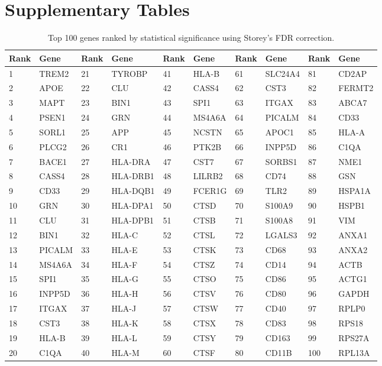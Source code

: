 \documentclass[12pt]{article}
\begin{document}
\section*{Supplementary Tables}

\begin{table}[H]
\centering
\scriptsize
\begin{tabular}{ll|ll|ll|ll|ll}
\toprule
\textbf{Rank} & \textbf{Gene} & \textbf{Rank} & \textbf{Gene} & \textbf{Rank} & \textbf{Gene} & \textbf{Rank} & \textbf{Gene} & \textbf{Rank} & \textbf{Gene} \\
\midrule
1 & TREM2 & 21 & TYROBP & 41 & HLA-B & 61 & SLC24A4 & 81 & CD2AP \\
2 & APOE & 22 & CLU & 42 & CASS4 & 62 & CST3 & 82 & FERMT2 \\
3 & MAPT & 23 & BIN1 & 43 & SPI1 & 63 & ITGAX & 83 & ABCA7 \\
4 & PSEN1 & 24 & GRN & 44 & MS4A6A & 64 & PICALM & 84 & CD33 \\
5 & SORL1 & 25 & APP & 45 & NCSTN & 65 & APOC1 & 85 & HLA-A \\
6 & PLCG2 & 26 & CR1 & 46 & PTK2B & 66 & INPP5D & 86 & C1QA \\
7 & BACE1 & 27 & HLA-DRA & 47 & CST7 & 67 & SORBS1 & 87 & NME1 \\
8 & CASS4 & 28 & HLA-DRB1 & 48 & LILRB2 & 68 & CD74 & 88 & GSN \\
9 & CD33 & 29 & HLA-DQB1 & 49 & FCER1G & 69 & TLR2 & 89 & HSPA1A \\
10 & GRN & 30 & HLA-DPA1 & 50 & CTSD & 70 & S100A9 & 90 & HSPB1 \\
11 & CLU & 31 & HLA-DPB1 & 51 & CTSB & 71 & S100A8 & 91 & VIM \\
12 & BIN1 & 32 & HLA-C & 52 & CTSL & 72 & LGALS3 & 92 & ANXA1 \\
13 & PICALM & 33 & HLA-E & 53 & CTSK & 73 & CD68 & 93 & ANXA2 \\
14 & MS4A6A & 34 & HLA-F & 54 & CTSZ & 74 & CD14 & 94 & ACTB \\
15 & SPI1 & 35 & HLA-G & 55 & CTSO & 75 & CD86 & 95 & ACTG1 \\
16 & INPP5D & 36 & HLA-H & 56 & CTSV & 76 & CD80 & 96 & GAPDH \\
17 & ITGAX & 37 & HLA-J & 57 & CTSW & 77 & CD40 & 97 & RPLP0 \\
18 & CST3 & 38 & HLA-K & 58 & CTSX & 78 & CD83 & 98 & RPS18 \\
19 & HLA-B & 39 & HLA-L & 59 & CTSY & 79 & CD163 & 99 & RPS27A \\
20 & C1QA & 40 & HLA-M & 60 & CTSF & 80 & CD11B & 100 & RPL13A \\
\bottomrule
\end{tabular}
\caption{Top 100 genes ranked by statistical significance using Storey's FDR correction.}
\end{table}
\end{document}
